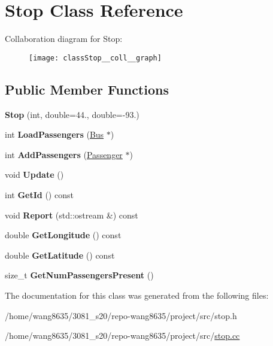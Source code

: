 \hypertarget{classStop}{}\section{Stop Class Reference}
\label{classStop}


Collaboration diagram for Stop\+:\nopagebreak
\begin{figure}[H]
\begin{center}
\leavevmode
\texttt{[image: classStop\_\_coll\_\_graph]}
\end{center}
\end{figure}
\subsection*{Public Member Functions}
\begin{DoxyCompactItemize}
\item 
\mbox{\label{classStop_a59d881f072b1cf89512bb15a51ffc773}} 
{\bfseries Stop} (int, double=44., double=-\/93.)
\item 
\mbox{\label{classStop_a02c6dcba2b6de5fdd008cf623f19bf7c}} 
int {\bfseries Load\+Passengers} (\hyperlink{classBus}{Bus} $\ast$)
\item 
\mbox{\label{classStop_a20a8b6035679d92a7a838a03a102bcd1}} 
int {\bfseries Add\+Passengers} (\hyperlink{classPassenger}{Passenger} $\ast$)
\item 
\mbox{\label{classStop_aa373ae256ce6bc01ef13e876dfdec5bd}} 
void {\bfseries Update} ()
\item 
\mbox{\label{classStop_a2f3b845d5a338f197226c90696314904}} 
int {\bfseries Get\+Id} () const
\item 
\mbox{\label{classStop_a8e286b7cca2dce6977ebda6f01805d94}} 
void {\bfseries Report} (std\+::ostream \&) const
\item 
\mbox{\label{classStop_a89e650eecf57c03ba0a5222bf5f666f5}} 
double {\bfseries Get\+Longitude} () const
\item 
\mbox{\label{classStop_a20ad94a1876baf31d8cf0708aae4d21f}} 
double {\bfseries Get\+Latitude} () const
\item 
\mbox{\label{classStop_a38b567326cfc072113b305a77a9e1315}} 
size\+\_\+t {\bfseries Get\+Num\+Passengers\+Present} ()
\end{DoxyCompactItemize}


The documentation for this class was generated from the following files\+:\begin{DoxyCompactItemize}
\item 
/home/wang8635/3081\+\_\+s20/repo-\/wang8635/project/src/stop.\+h\item 
/home/wang8635/3081\+\_\+s20/repo-\/wang8635/project/src/\hyperlink{stop_8cc}{stop.\+cc}\end{DoxyCompactItemize}
